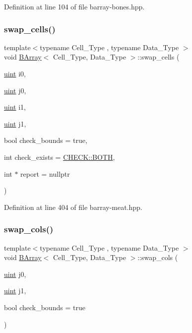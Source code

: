Definition at line 104 of file barray-\/bones.\+hpp.

\mbox{\label{class_b_array_afb7976f67770b850922c1a7e1d6b07cc}} 
\subsubsection{\texorpdfstring{swap\+\_\+cells()}{swap\_cells()}}
{\footnotesize\ttfamily template$<$typename Cell\+\_\+\+Type , typename Data\+\_\+\+Type $>$ \\
void \hyperlink{class_b_array}{B\+Array}$<$ Cell\+\_\+\+Type, Data\+\_\+\+Type $>$\+::swap\+\_\+cells (\begin{DoxyParamCaption}\item[{\hyperlink{typedefs_8hpp_a91ad9478d81a7aaf2593e8d9c3d06a14}{uint}}]{i0,  }\item[{\hyperlink{typedefs_8hpp_a91ad9478d81a7aaf2593e8d9c3d06a14}{uint}}]{j0,  }\item[{\hyperlink{typedefs_8hpp_a91ad9478d81a7aaf2593e8d9c3d06a14}{uint}}]{i1,  }\item[{\hyperlink{typedefs_8hpp_a91ad9478d81a7aaf2593e8d9c3d06a14}{uint}}]{j1,  }\item[{bool}]{check\+\_\+bounds = {\ttfamily true},  }\item[{int}]{check\+\_\+exists = {\ttfamily \hyperlink{namespace_c_h_e_c_k_a3acda1c74bfabb5b6b67e19d0ad2d52a}{C\+H\+E\+C\+K\+::\+B\+O\+TH}},  }\item[{int $\ast$}]{report = {\ttfamily nullptr} }\end{DoxyParamCaption})\hspace{0.3cm}{\ttfamily [inline]}}



Definition at line 404 of file barray-\/meat.\+hpp.

\mbox{\label{class_b_array_ae94f7e61ca5985244968d9daf2859229}} 
\subsubsection{\texorpdfstring{swap\+\_\+cols()}{swap\_cols()}}
{\footnotesize\ttfamily template$<$typename Cell\+\_\+\+Type , typename Data\+\_\+\+Type $>$ \\
void \hyperlink{class_b_array}{B\+Array}$<$ Cell\+\_\+\+Type, Data\+\_\+\+Type $>$\+::swap\+\_\+cols (\begin{DoxyParamCaption}\item[{\hyperlink{typedefs_8hpp_a91ad9478d81a7aaf2593e8d9c3d06a14}{uint}}]{j0,  }\item[{\hyperlink{typedefs_8hpp_a91ad9478d81a7aaf2593e8d9c3d06a14}{uint}}]{j1,  }\item[{bool}]{check\+\_\+bounds = {\ttfamily true} }\end{DoxyParamCaption})\hspace{0.3cm}{\ttfamily [inline]}}



